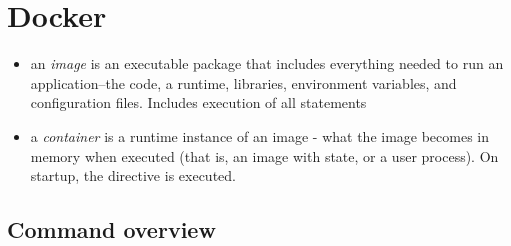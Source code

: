 \section{Docker}

\begin{itemize}
    \item an \emph{image} is an executable package that includes everything needed to run an application--the code, a runtime, libraries, environment variables, and configuration files. Includes execution of all  statements
    \item a \emph{container} is a runtime instance of an image - what the image becomes in memory when executed (that is, an image with state, or a user process). On startup, the  directive is executed.
\end{itemize}


\subsection{Command overview}

